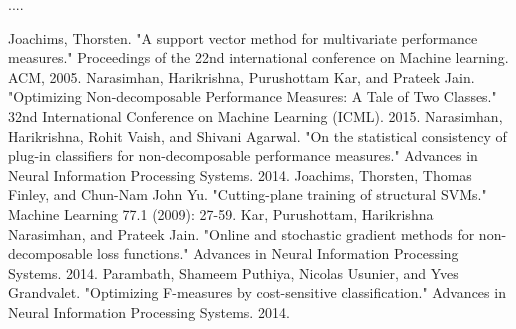 \documentclass{article} %
\begin{document}
....

\begin{thebibliography}{99}
	
	 Joachims, Thorsten. "A support vector method for multivariate performance measures." Proceedings of the 22nd international conference on Machine learning. ACM, 2005.
	 Narasimhan, Harikrishna, Purushottam Kar, and Prateek Jain. "Optimizing Non-decomposable Performance Measures: A Tale of Two Classes." 32nd International Conference on Machine Learning (ICML). 2015.
	 Narasimhan, Harikrishna, Rohit Vaish, and Shivani Agarwal. "On the statistical consistency of plug-in classifiers for non-decomposable performance measures." Advances in Neural Information Processing Systems. 2014.
	 Joachims, Thorsten, Thomas Finley, and Chun-Nam John Yu. "Cutting-plane training of structural SVMs." Machine Learning 77.1 (2009): 27-59.
	 Kar, Purushottam, Harikrishna Narasimhan, and Prateek Jain. "Online and stochastic gradient methods for non-decomposable loss functions." Advances in Neural Information Processing Systems. 2014.
	 Parambath, Shameem Puthiya, Nicolas Usunier, and Yves Grandvalet. "Optimizing F-measures by cost-sensitive classification." Advances in Neural Information Processing Systems. 2014.
	
\end{thebibliography}
\end{document}
